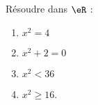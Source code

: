 
\begin{exercice}\label{exosmath-0660}

    Résoudre dans \( \eR\) :
    \begin{multicols}{2}
        \begin{enumerate}
            \item
            \( x^2=4\)
        \item
            \( x^2+2=0\)
        \item
            \( x^2<36\)
        \item
            \( x^2\geq 16\).
        \end{enumerate}
    \end{multicols}

\end{exercice}
